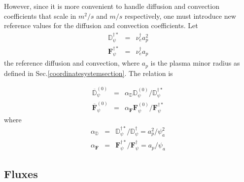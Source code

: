 However, since it is more convenient to handle diffusion and convection
coefficients that scale in $m^{2}/s$ and $m/s$ respectively, one must
introduce new reference values for the diffusion and convection
coefficients. Let 
\begin{eqnarray}
\mathbb{D}_{\psi }^{\dag *} &=&\nu _{e}^{\dag }a_{p}^{2} \\
\mathbf{F}_{\psi }^{\dag *} &=&\nu _{e}^{\dag }a_{p}
\end{eqnarray}
the reference diffusion and convection, where $a_{p}$ is the plasma minor
radius as defined in Sec.\ref{coordinatesystemsection}. The relation is

\begin{eqnarray}
\overline{\mathbb{D}}_{\psi }^{\left( 0\right) } &=&\alpha _{\mathbb{D}}%
\mathbb{D} _{\psi }^{\left( 0\right) }/\mathbb{D}_{\psi }^{\dag *} \\
\overline{\mathbf{F}}_{\psi }^{\left( 0\right) } &=&\alpha _{\mathbf{F}}%
\mathbf{F}_{\psi }^{\left( 0\right) }/\mathbf{F}_{\psi }^{\dag *}
\end{eqnarray}
where 
\begin{eqnarray}
\alpha _{\mathbb{D}} &=&\mathbb{D}_{\psi }^{\dag *}/\mathbb{D}_{\psi }^{\dag
}=a_{p}^{2}/\psi _{a}^{2} \\
\alpha _{\mathbf{F}} &=&\mathbf{F}_{\psi }^{\dag *}/\mathbf{F}_{\psi }^{\dag
}=a_{p}/\psi _{a}
\end{eqnarray}

\subsection{Fluxes}


